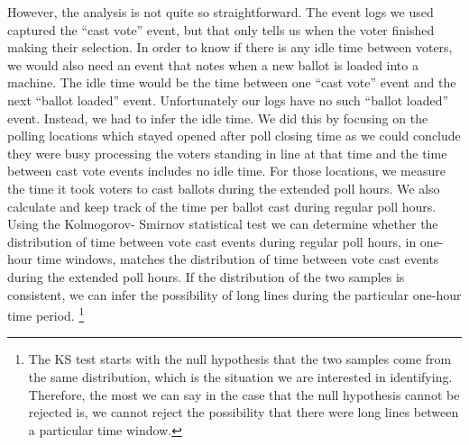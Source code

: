 However, the analysis is not quite so straightforward. The event logs
we used captured the \textquotedblleft cast vote'' event, but that
only tells us when the voter finished making their selection. In order
to know if there is any idle time between voters, we would also need
an event that notes when a new ballot is loaded into a machine. The
idle time would be the time between one \textquotedblleft cast vote''
event and the next \textquotedblleft ballot loaded''
event. Unfortunately our logs have no such \textquotedblleft ballot
loaded'' event. Instead, we had to infer the idle time. We did this by
focusing on the polling locations which stayed opened after poll
closing time as we could conclude they were busy processing the voters
standing in line at that time and the time between cast vote events
includes no idle time. For those locations, we measure the time it
took voters to cast ballots during the extended poll hours. We also
calculate and keep track of the time per ballot cast during regular
poll hours. Using the Kolmogorov- Smirnov statistical test we can
determine whether the distribution of time between vote cast events
during regular poll hours, in one-hour time windows, matches the
distribution of time between vote cast events during the extended poll
hours. If the distribution of the two samples is consistent, we can
infer the possibility of long lines during the particular one-hour
time period. \footnote{The KS test starts with the null hypothesis
  that the two samples come from the same distribution, which is the
  situation we are interested in identifying. Therefore, the most we
  can say in the case that the null hypothesis cannot be rejected is, we
  cannot reject the possibility that there were long lines between a
  particular time window.} 
